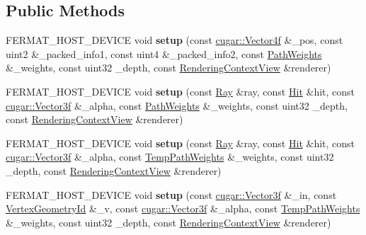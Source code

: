 \subsection*{Public Methods}
\begin{DoxyCompactItemize}
\item 
\mbox{\label{struct_light_vertex_a29e68f91cafe19c7f84cb8781c1b4ca8}} 
F\+E\+R\+M\+A\+T\+\_\+\+H\+O\+S\+T\+\_\+\+D\+E\+V\+I\+CE void {\bfseries setup} (const \hyperlink{structcugar_1_1_vector}{cugar\+::\+Vector4f} \&\+\_\+pos, const uint2 \&\+\_\+packed\+\_\+info1, const uint4 \&\+\_\+packed\+\_\+info2, const \hyperlink{struct_path_weights}{Path\+Weights} \&\+\_\+weights, const uint32 \+\_\+depth, const \hyperlink{struct_rendering_context_view}{Rendering\+Context\+View} \&renderer)
\item 
\mbox{\label{struct_light_vertex_a22ac8565e0127206de026c6dd405279f}} 
F\+E\+R\+M\+A\+T\+\_\+\+H\+O\+S\+T\+\_\+\+D\+E\+V\+I\+CE void {\bfseries setup} (const \hyperlink{struct_ray}{Ray} \&ray, const \hyperlink{struct_hit}{Hit} \&hit, const \hyperlink{structcugar_1_1_vector}{cugar\+::\+Vector3f} \&\+\_\+alpha, const \hyperlink{struct_path_weights}{Path\+Weights} \&\+\_\+weights, const uint32 \+\_\+depth, const \hyperlink{struct_rendering_context_view}{Rendering\+Context\+View} \&renderer)
\item 
\mbox{\label{struct_light_vertex_a440fe1427988cbf9547738776cccd582}} 
F\+E\+R\+M\+A\+T\+\_\+\+H\+O\+S\+T\+\_\+\+D\+E\+V\+I\+CE void {\bfseries setup} (const \hyperlink{struct_ray}{Ray} \&ray, const \hyperlink{struct_hit}{Hit} \&hit, const \hyperlink{structcugar_1_1_vector}{cugar\+::\+Vector3f} \&\+\_\+alpha, const \hyperlink{struct_temp_path_weights}{Temp\+Path\+Weights} \&\+\_\+weights, const uint32 \+\_\+depth, const \hyperlink{struct_rendering_context_view}{Rendering\+Context\+View} \&renderer)
\item 
\mbox{\label{struct_light_vertex_adc19dba9e6283b4c0da2eec3237c914a}} 
F\+E\+R\+M\+A\+T\+\_\+\+H\+O\+S\+T\+\_\+\+D\+E\+V\+I\+CE void {\bfseries setup} (const \hyperlink{structcugar_1_1_vector}{cugar\+::\+Vector3f} \&\+\_\+in, const \hyperlink{struct_vertex_geometry_id}{Vertex\+Geometry\+Id} \&\+\_\+v, const \hyperlink{structcugar_1_1_vector}{cugar\+::\+Vector3f} \&\+\_\+alpha, const \hyperlink{struct_temp_path_weights}{Temp\+Path\+Weights} \&\+\_\+weights, const uint32 \+\_\+depth, const \hyperlink{struct_rendering_context_view}{Rendering\+Context\+View} \&renderer)

\end{DoxyCompactItemize}
